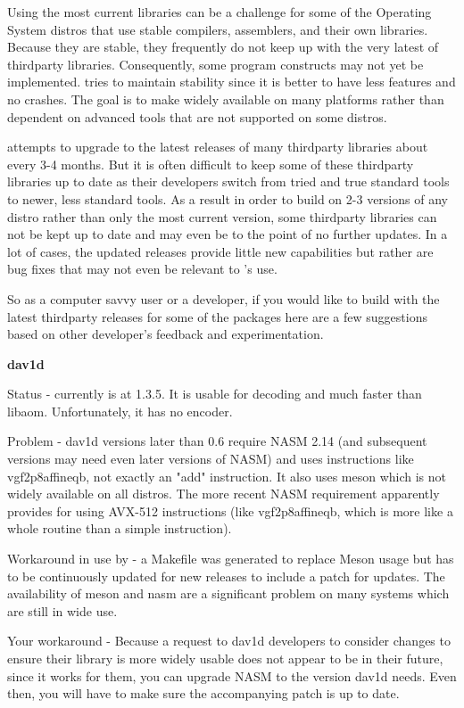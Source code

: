 Using the most current libraries can be a challenge for some of the Operating System distros that use
stable compilers, assemblers, and their own libraries.  Because they are stable, they frequently do
not keep up with the very latest of thirdparty libraries.  Consequently, some program constructs may
not yet be implemented.  \CGG{} tries to maintain stability since it is better to have less features
and no crashes.  The goal is to make \CGG{} widely available on many platforms rather than
dependent on advanced tools that are not supported on some distros.

\CGG{} attempts to upgrade to the latest releases of many thirdparty libraries about every 3-4
months. But it is often difficult to keep some of these thirdparty libraries up to date as their
developers switch from tried and true standard tools to newer, less standard tools. As a result 
in order to build \CGG{} on 2-3 versions of any distro rather than only the most current version,
some thirdparty libraries can not be kept up to date and may even be to the point of no further
updates.  In a lot of cases, the updated releases provide little new capabilities but rather
are bug fixes that may not even be relevant to \CGG{}'s use.

So as a computer savvy user or a developer, if you would like to build \CGG{} with the latest
thirdparty releases for some of the packages here are a few suggestions based on other 
developer's feedback and experimentation.

\textbf{dav1d} 
\begin{description}[noitemsep]
     \item Status - currently \CGG{} is at 1.3.5. It is usable for decoding and much
faster than libaom.  Unfortunately, it has no encoder.
     \item Problem - dav1d versions later than 0.6 require NASM 2.14 (and subsequent
versions may need even later versions of NASM) and uses instructions like vgf2p8affineqb,
not exactly an "add" instruction. It also uses meson which is not widely available on all
distros.  The more recent NASM requirement apparently provides for using AVX-512 
instructions (like vgf2p8affineqb, which is more like a whole routine than a simple instruction).
     \item Workaround in use by \CGG{} - a Makefile was generated to replace Meson usage
but has to be continuously updated for new releases to include a patch for updates. 
The availability of meson and nasm are a significant problem on
many systems which are still in wide use.
     \item Your workaround - Because a request to dav1d developers to consider changes to
ensure their library is more widely usable does not appear to be in their future, since it works
for them, you can upgrade NASM to the version dav1d needs.  Even then, you will have to
make sure the accompanying patch is up to date.
\end{description}


